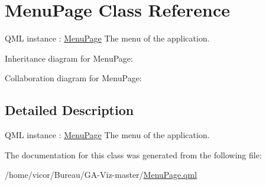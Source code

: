 \hypertarget{class_menu_page}{}\section{Menu\+Page Class Reference}
\label{class_menu_page}


Q\+ML instance \+: \hyperlink{class_menu_page}{Menu\+Page} The menu of the application.  




Inheritance diagram for Menu\+Page\+:


Collaboration diagram for Menu\+Page\+:


\subsection{Detailed Description}
Q\+ML instance \+: \hyperlink{class_menu_page}{Menu\+Page} The menu of the application. 

The documentation for this class was generated from the following file\+:\begin{DoxyCompactItemize}
\item 
/home/vicor/\+Bureau/\+G\+A-\/\+Viz-\/master/\hyperlink{_menu_page_8qml}{Menu\+Page.\+qml}\end{DoxyCompactItemize}
